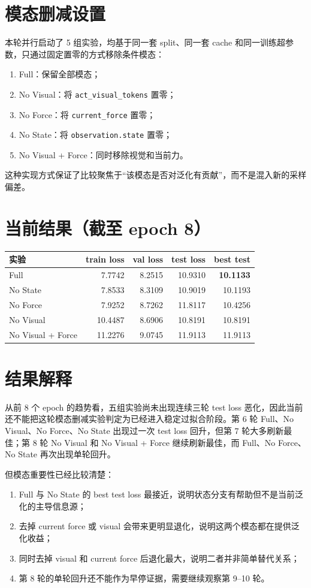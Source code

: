 \documentclass[UTF8,a4paper,11pt,fontset=none]{ctexart}
\begin{document}
\section{模态删减设置}
本轮并行启动了 5 组实验，均基于同一套 split、同一套 cache 和同一训练超参数，只通过固定置零的方式移除条件模态：
\begin{enumerate}
\item Full：保留全部模态；
\item No Visual：将 \texttt{act\_visual\_tokens} 置零；
\item No Force：将 \texttt{current\_force} 置零；
\item No State：将 \texttt{observation.state} 置零；
\item No Visual + Force：同时移除视觉和当前力。
\end{enumerate}

这种实现方式保证了比较聚焦于“该模态是否对泛化有贡献”，而不是混入新的采样偏差。

\section{当前结果（截至 epoch 8）}
\begin{longtable}{p{}r r r r}
\toprule
实验 & train loss & val loss & test loss & best test \\
\midrule
Full & 7.7742 & 8.2515 & 10.9310 & \colorbox{greenbg}{\textbf{10.1133}} \\
No State & 7.8533 & 8.3109 & 10.9019 & 10.1193 \\
No Force & 7.9252 & 8.7262 & 11.8117 & 10.4256 \\
No Visual & 10.4487 & 8.6906 & 10.8191 & 10.8191 \\
No Visual + Force & 11.2276 & 9.0745 & 11.9113 & 11.9113 \\
\bottomrule
\end{longtable}

\section{结果解释}
从前 8 个 epoch 的趋势看，五组实验尚未出现连续三轮 test loss 恶化，因此当前还不能把这轮模态删减实验判定为已经进入稳定过拟合阶段。第 6 轮 Full、No Visual、No Force、No State 出现过一次 test loss 回升，但第 7 轮大多刷新最佳；第 8 轮 No Visual 和 No Visual + Force 继续刷新最佳，而 Full、No Force、No State 再次出现单轮回升。

但模态重要性已经比较清楚：
\begin{enumerate}
\item Full 与 No State 的 best test loss 最接近，说明状态分支有帮助但不是当前泛化的主导信息源；
\item 去掉 current force 或 visual 会带来更明显退化，说明这两个模态都在提供泛化收益；
\item 同时去掉 visual 和 current force 后退化最大，说明二者并非简单替代关系；
\item 第 8 轮的单轮回升还不能作为早停证据，需要继续观察第 9--10 轮。
\end{enumerate}
\end{document}
